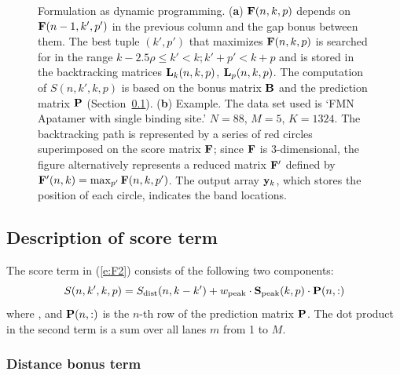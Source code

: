 \begin{figure}
\caption{Formulation as dynamic programming. (\textbf{a}) ${\mathbf{F}}(n,k,p)$ depends on ${\mathbf{F}}(n-1,k',p')$ in the previous column and the gap bonus  between them. The best tuple $(k',p')$ that maximizes ${\mathbf{F}}(n,k,p)$ is searched for in the range $k-2.5\rho \le k' < k; k'+p' < k+p$ and is stored in the backtracking matrices ${\mathbf{L}}_k(n,k,p)$, ${\mathbf{L}}_p(n,k,p)$. The computation of $S(n,k',k,p)$ is based on the bonus matrix ${\mathbf{B}}$ and the prediction matrix ${\mathbf{P}}$ (Section~\ref{ss:cost}). (\textbf{b}) Example. The data set used is `FMN Apatamer with single binding site.' $N=88$, $M=5$, $K=1324$. The backtracking path is represented by a series of red circles superimposed on the score matrix ${\mathbf{F}}$; since ${\mathbf{F}}$ is 3-dimensional, the figure alternatively represents a reduced matrix ${\mathbf{F}}'$ defined by ${\mathbf{F}}'(n,k)=\max_{p'} {\mathbf{F}}(n,k,p')$. The output array ${\mathbf{y}}_k$, which stores the position of each circle, indicates the band locations.}
\label{f:dp-formulation}
\end{figure}


\subsection{Description of score term}\label{ss:cost}
The score term in (\ref{e:F2}) consists of the following two components:
%
\begin{equation}\label{e:score-term}
S(n,k',k,p) = S_{\textrm{dist}}(n,k-k') + w_{\textrm{peak}} \cdot \bold{S}_{\textrm{peak}} (k,p) \cdot {\mathbf{P}}(n, :)
\end{equation}
%
where , and ${\mathbf{P}}(n,:)$ is the $n$-th row of the prediction matrix ${\mathbf{P}}$. The dot product in the second term is a sum over all lanes $m$ from 1 to $M$. 


\subsubsection{Distance bonus term}

